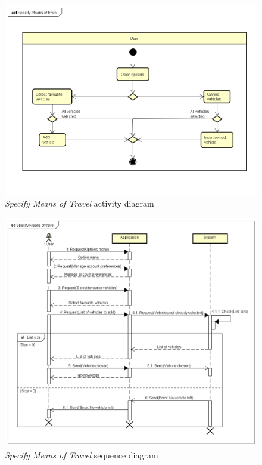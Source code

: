 \begin{figure}[h]
	\includegraphics[width=\textheight, height=\textwidth, angle=90, keepaspectratio=true]{Img/SpecifyMeansofTravelAC}
	\caption{\emph{Specify Means of Travel} activity diagram}
	\label{fig:SpecifyMeansofTravelAC}
\end{figure}

\begin{figure}
	\includegraphics[width=\textheight, height=\textwidth, angle=90, keepaspectratio=true]{Img/SpecifyMeansofTravelSQ}
	\caption{\emph{Specify Means of Travel} sequence diagram}
	\label{fig:SpecifyMeansofTravelSQ}
\end{figure}

